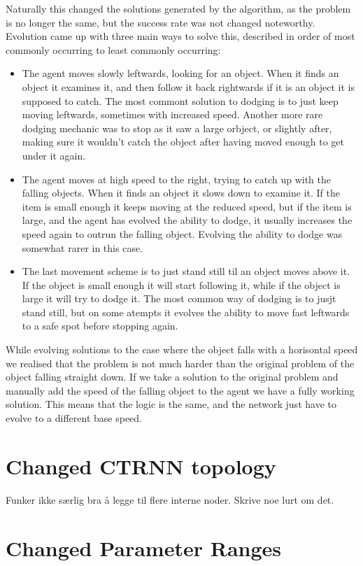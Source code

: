 \documentclass[a4paper,12pt]{article}
\begin{document}
Naturally this changed the solutions generated by the algorithm, as the problem is no longer the same, but the success rate was not changed noteworthy. Evolution came up with three main ways to solve this, described in order of most commonly occurring to least commonly occurring:
\begin{itemize}
\item{The agent moves slowly leftwards, looking for an object. When it finds an object it examines it, and then follow it back rightwards if it is an object it is supposed to catch. The most commont solution to dodging is to just keep moving leftwards, sometimes with increased speed. Another more rare dodging mechanic was to stop as it saw a large orbject, or slightly after, making sure it wouldn't catch the object after having moved enough to get under it again.}
\item{The agent moves at high speed to the right, trying to catch up with the falling objects. When it finds an object it slows down to examine it. If the item is small enough it keeps moving at the reduced speed, but if the item is large, and the agent has evolved the ability to dodge, it usually increases the speed again to outrun the falling object. Evolving the ability to dodge was somewhat rarer in this case.}
\item{The last movement scheme is to just stand still til an object moves above it. If the object is small enough it will start following it, while if the object is large it will try to dodge it. The most common way of dodging is to jusjt stand still, but on some atempts it evolves the ability to move fast leftwards to a safe spot before stopping again.}
\end{itemize}
While evolving solutions to the case where the object falls with a horisontal speed we realised that the problem is not much harder than the original problem of the object falling straight down. If we take a solution to the original problem and manually add the speed of the falling object to the agent we have a fully working solution. This means that the logic is the same, and the network just have to evolve to a different base speed.

\section{Changed CTRNN topology}
Funker ikke særlig bra å legge til flere interne noder. Skrive noe lurt om det.

\section{Changed Parameter Ranges}
\end{document}

